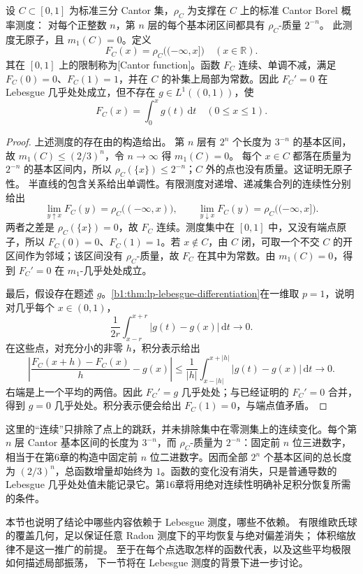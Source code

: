 \begin{proposition}[Cantor 函数]\label{b1:eg:cantor-function}
设 \(C\subset[0,1]\) 为标准三分 Cantor 集，\(\rho_C\) 为支撑在 \(C\) 上的标准 Cantor Borel 概率测度：
对每个正整数 \(n\)，第 \(n\) 层的每个基本闭区间都具有 \(\rho_C\)-质量 \(2^{-n}\)。
此测度无原子，且 \(m_1(C)=0\)。定义
\[
 F_C(x)=\rho_C\bigl((-\infty,x]\bigr)\quad(x\in\mathbb R).
\]
其在 \([0,1]\) 上的限制称为[Cantor function]。函数 \(F_C\) 连续、单调不减，满足 \(F_C(0)=0\)、\(F_C(1)=1\)，并在 \(C\) 的补集上局部为常数。因此 \(F_C'=0\) 在 Lebesgue 几乎处处成立，但不存在 \(g\in L^1((0,1))\)，使
\[
 F_C(x)=\int_0^xg(t)\,\mathrm dt\quad(0\leq x\leq1).
\]
\end{proposition}
\begin{proof}
上述测度的存在由的构造给出。
第 \(n\) 层有 \(2^n\) 个长度为 \(3^{-n}\) 的基本区间，故
\(m_1(C)\le(2/3)^n\)，令 \(n\to\infty\) 得 \(m_1(C)=0\)。
每个 \(x\in C\) 都落在质量为 \(2^{-n}\) 的基本区间内，所以
\(\rho_C(\{x\})\le2^{-n}\)；\(C\) 外的点也没有质量。这证明无原子性。
半直线的包含关系给出单调性。有限测度对递增、递减集合列的连续性分别给出
\[
 \lim_{y\uparrow x}F_C(y)=\rho_C\bigl((-\infty,x)\bigr),\qquad
 \lim_{y\downarrow x}F_C(y)=\rho_C\bigl((-\infty,x]\bigr).
\]
两者之差是 \(\rho_C(\{x\})=0\)，故 \(F_C\) 连续。测度集中在 \([0,1]\) 中，又没有端点原子，所以 \(F_C(0)=0\)、\(F_C(1)=1\)。若 \(x\notin C\)，由 \(C\) 闭，可取一个不交 \(C\) 的开区间作为邻域；该区间没有 \(\rho_C\)-质量，故 \(F_C\) 在其中为常数。由 \(m_1(C)=0\)，得到 \(F_C'=0\) 在 \(m_1\)-几乎处处成立。

最后，假设存在题述 \(g\)。\cref{b1:thm:lp-lebesgue-differentiation}在一维取 \(p=1\)，说明对几乎每个 \(x\in(0,1)\)，
\[
 \frac1{2r}\int_{x-r}^{x+r}|g(t)-g(x)|\,\mathrm dt\longrightarrow0.
\]
在这些点，对充分小的非零 \(h\)，积分表示给出
\[
 \left|\frac{F_C(x+h)-F_C(x)}h-g(x)\right|
 \leq\frac1{|h|}\int_{x-|h|}^{x+|h|}|g(t)-g(x)|\,\mathrm dt
 \longrightarrow0.
\]
右端是上一个平均的两倍。因此 \(F_C'=g\) 几乎处处；与已经证明的 \(F_C'=0\) 合并，得到 \(g=0\) 几乎处处。积分表示便会给出 \(F_C(1)=0\)，与端点值矛盾。
\end{proof}

这里的“连续”只排除了点上的跳跃，并未排除集中在零测集上的连续变化。每个第 \(n\) 层 Cantor 基本区间的长度为 \(3^{-n}\)，而 \(\rho_C\)-质量为 \(2^{-n}\)：固定前 \(n\) 位三进数字，相当于在第6章的构造中固定前 \(n\) 位二进数字。因而全部 \(2^n\) 个基本区间的总长度为 \((2/3)^n\)，总函数增量却始终为 \(1\)。函数的变化没有消失，只是普通导数的 Lebesgue 几乎处处值未能记录它。第16章将用绝对连续性明确补足积分恢复所需的条件。

\ProseParagraphBreak

本节也说明了结论中哪些内容依赖于 Lebesgue 测度，哪些不依赖。
有限维欧氏球的覆盖几何，足以保证任意 Radon 测度下的平均恢复与绝对偏差消失；
体积缩放律不是这一推广的前提。
至于在每个点选取怎样的函数代表，以及这些平均极限如何描述局部振荡，
下一节将在 Lebesgue 测度的背景下进一步讨论。

